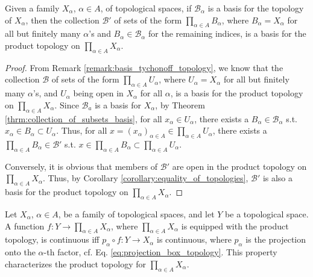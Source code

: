 \begin{theorem}
	Given a family $X_{\alpha}$, $\alpha\in A$, of topological spaces, if $\mathscr B_{\alpha}$ is a basis for the topology of $X_{\alpha}$, then the collection $\mathscr B'$ of sets of the form $\prod_{\alpha\in A}B_{\alpha}$, where $B_{\alpha} = X_{\alpha}$ for all but finitely many $\alpha$'s and $B_{\alpha}\in \mathscr B_{\alpha}$ for the remaining indices, is a basis for the product topology on $\prod_{\alpha\in A}X_{\alpha}$.
\end{theorem}

\begin{proof}
	From Remark \ref{remark:basis_tychonoff_topology}, we know that the collection $\mathscr B$ of sets of the form $\prod_{\alpha\in A}U_{\alpha}$, where $U_{\alpha} = X_{\alpha}$ for all but finitely many $\alpha$'s, and $U_{\alpha}$ being open in $X_{\alpha}$ for all $\alpha$, is a basis for the product topology on $\prod_{\alpha\in A}X_{\alpha}$. Since $\mathscr B_a$ is a basis for $X_{\alpha}$, by Theorem \ref{thrm:collection_of_subsets_basis}, for all $x_{\alpha}\in U_{\alpha}$, there exists a $B_{\alpha}\in \mathscr B_{\alpha}$ s.t. $x_{\alpha}\in B_{\alpha}\subset U_{\alpha}$. Thus, for all $x = \left(x_{\alpha}\right)_{\alpha\in A}\in \prod_{\alpha \in A}U_{\alpha}$, there exists a $\prod_{\alpha\in A} B_{\alpha}\in\mathscr B'$ s.t. $x\in \prod_{\alpha\in A}B_{\alpha}\subset \prod_{\alpha\in A}U_{\alpha}$. 
	
	Conversely, it is obvious that members of $\mathscr B'$ are open in the product topology on $\prod_{\alpha\in A}X_{\alpha}$. Thus, by Corollary \ref{corollary:equality_of_topologies}, $\mathscr B'$ is also a basis for the product topology on $\prod_{\alpha\in A}X_{\alpha}$.
\end{proof}

\begin{theorem}
	Let $X_\alpha$, $\alpha\in A$, be a family of topological spaces, and let $Y$ be a topological space. A function $f: Y\to \prod_{\alpha\in A}X_{\alpha}$, where $\prod_{\alpha\in A}X_{\alpha}$ is equipped with the product topology, is continuous iff $p_{\alpha}\circ f: Y\to X_{\alpha}$ is continuous, where $p_{\alpha}$ is the projection onto the $\alpha$-th factor, cf. Eq. \eqref{eq:projection_box_topology}. This property characterizes the product topology for $\prod_{\alpha\in A}X_{\alpha}$.
\end{theorem}

